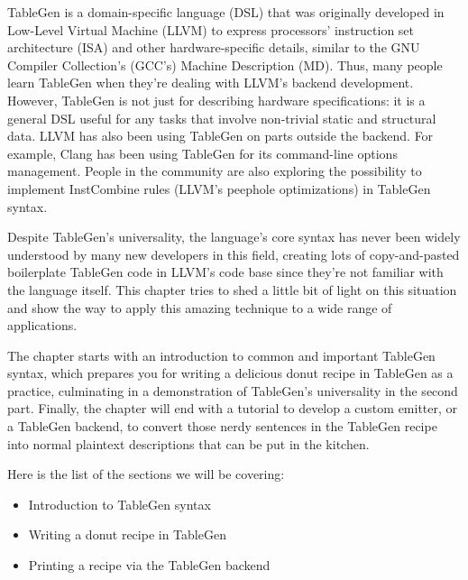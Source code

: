 TableGen is a domain-specific language (DSL) that was originally developed in Low-Level Virtual Machine (LLVM) to express processors' instruction set architecture (ISA) and other hardware-specific details, similar to the GNU Compiler Collection's (GCC's) Machine Description (MD). Thus, many people learn TableGen when they're dealing with LLVM's backend development. However, TableGen is not just for describing hardware specifications: it is a general DSL useful for any tasks that involve non-trivial static and structural data. LLVM has also been using TableGen on parts outside the backend. For example, Clang has been using TableGen for its command-line options management. People in the community are also exploring the possibility to implement InstCombine rules (LLVM's peephole optimizations) in TableGen syntax.

Despite TableGen's universality, the language's core syntax has never been widely understood by many new developers in this field, creating lots of copy-and-pasted boilerplate TableGen code in LLVM's code base since they're not familiar with the language itself. This chapter tries to shed a little bit of light on this situation and show the way to apply this amazing technique to a wide range of applications.

The chapter starts with an introduction to common and important TableGen syntax, which prepares you for writing a delicious donut recipe in TableGen as a practice, culminating in a demonstration of TableGen's universality in the second part. Finally, the chapter will end with a tutorial to develop a custom emitter, or a TableGen backend, to convert those nerdy sentences in the TableGen recipe into normal plaintext descriptions that can be put in the kitchen.

Here is the list of the sections we will be covering:

\begin{itemize}
\item Introduction to TableGen syntax
\item Writing a donut recipe in TableGen
\item Printing a recipe via the TableGen backend
\end{itemize}















